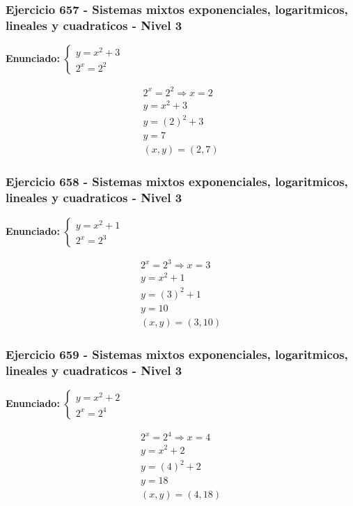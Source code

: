 \documentclass[12pt,a4paper]{article}
\begin{document}
\subsubsection*{Ejercicio 657 - Sistemas mixtos exponenciales, logaritmicos, lineales y cuadraticos - Nivel 3}
\textbf{Enunciado:} \(\begin{cases} y=x^2+3\\ 2^x=2^{2}\end{cases}\)

\[
\begin{aligned}
2^x=2^{2}\Rightarrow x=2\\
y=x^2+3\\
y=(2)^2+3\\
y=7\\
\boxed{(x,y)=(2,7)}
\end{aligned}
\]


\subsubsection*{Ejercicio 658 - Sistemas mixtos exponenciales, logaritmicos, lineales y cuadraticos - Nivel 3}
\textbf{Enunciado:} \(\begin{cases} y=x^2+1\\ 2^x=2^{3}\end{cases}\)

\[
\begin{aligned}
2^x=2^{3}\Rightarrow x=3\\
y=x^2+1\\
y=(3)^2+1\\
y=10\\
\boxed{(x,y)=(3,10)}
\end{aligned}
\]


\subsubsection*{Ejercicio 659 - Sistemas mixtos exponenciales, logaritmicos, lineales y cuadraticos - Nivel 3}
\textbf{Enunciado:} \(\begin{cases} y=x^2+2\\ 2^x=2^{4}\end{cases}\)

\[
\begin{aligned}
2^x=2^{4}\Rightarrow x=4\\
y=x^2+2\\
y=(4)^2+2\\
y=18\\
\boxed{(x,y)=(4,18)}
\end{aligned}
\]
\end{document}
